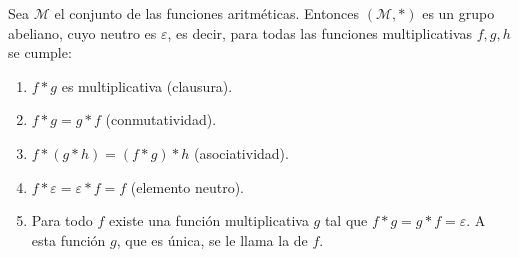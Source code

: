 \documentclass[teoria-numeros.tex]{subfiles}
\begin{document}
\begin{thm}
	Sea $\mathcal{M}$ el conjunto de las funciones aritméticas.
	Entonces $( \mathcal{M}, * )$ es un grupo abeliano, cuyo neutro es $\varepsilon$, es decir,
	para todas las funciones multiplicativas $f, g, h$ se cumple:
	\begin{enumerate}
		\item $f*g$ es multiplicativa (clausura).
		\item $f*g = g*f$ (conmutatividad).
		\item $f*(g*h) = (f*g)*h$ (asociatividad).
		\item $f*\varepsilon = \varepsilon*f = f$ (elemento neutro).
		\item Para todo $f$ existe una función multiplicativa $g$ tal que $f*g = g*f = \varepsilon$.
			A esta función $g$, que es única, se le llama la  de $f$.
	\end{enumerate}
\end{thm}
\end{document}
